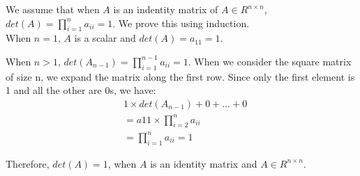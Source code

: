 \documentclass[10pt,a4paper]{article}
\begin{document}
We assume that when $A$ is an indentity matrix of $A\in R^{n\times n}$, $det(A) = \prod_{i=1}^{n}{a_{ii}} = 1$. We prove this using induction.\\

When $n=1$, $A$ is a scalar and $det(A) = a_{11} = 1$. 

When $n>1$, $det(A_{n-1}) = \prod_{i=1}^{n-1}{a_{ii}} = 1$. When we consider the square matrix of size n, we expand the matrix along the first row. Since only the first element is 1 and all the other are 0s, we have:
\begin{align*}
&1\times det(A_{n-1}) + 0 +\dots+0 \\
&= a11 \times  \prod_{i=2}^{n}{a_{ii}}\\
&=\prod_{i=1}^{n}{a_{ii}} = 1
\end{align*}

Therefore, $det(A) = 1$, when $A$ is an identity matrix and $A\in R^{n\times n}$.
\end{document}
